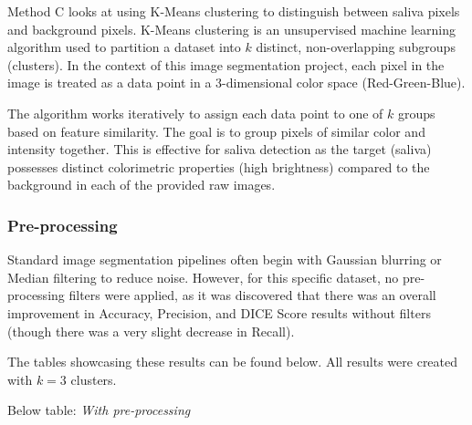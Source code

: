 Method C looks at using K-Means clustering \cite{macqueen1967some} to distinguish between saliva pixels and background pixels. K-Means clustering is an unsupervised machine learning algorithm used to partition a dataset into \(k\) distinct, non-overlapping subgroups (clusters). In the context of this image segmentation project, each pixel in the image is treated as a data point in a 3-dimensional color space (Red-Green-Blue).

The algorithm works iteratively to assign each data point to one of \(k\) groups based on feature similarity. The goal is to group pixels of similar color and intensity together. This is effective for saliva detection as the target (saliva) possesses distinct colorimetric properties (high brightness) compared to the background in each of the provided raw images.

\subsubsection{Pre-processing}

Standard image segmentation pipelines often begin with Gaussian blurring or Median filtering to reduce noise. However, for this specific dataset, no pre-processing filters were applied, as it was discovered that there was an overall improvement in Accuracy, Precision, and DICE Score results without filters (though there was a very slight decrease in Recall).

The tables showcasing these results can be found below. All results were created with \(k=3\) clusters.

Below table: \textit{With pre-processing}

\begin{table}[t]
  \centering
  \caption{Pre-processing decision matrix for Method C.}
  \label{tab:preprocessing-decision}
\end{table}

